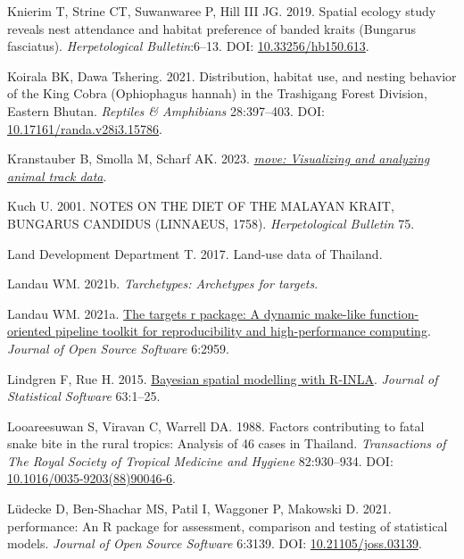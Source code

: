 \documentclass[10pt,a4paper]{article}
\newlength{\cslhangindent}
\newenvironment{CSLReferences}[2] %
 {\begin{list}{}{%
  \setlength{\itemindent}{0pt}
  \setlength{\leftmargin}{0pt}
  \setlength{\parsep}{0pt}
  \ifodd #1
   \setlength{\leftmargin}{\cslhangindent}
   \setlength{\itemindent}{-1\cslhangindent}
  \fi
  \setlength{\itemsep}{#2\baselineskip}}}
 {\end{list}}
\begin{document}
\begin{CSLReferences}{1}{0}
Knierim T, Strine CT, Suwanwaree P, Hill III JG. 2019. Spatial ecology study reveals nest attendance and habitat preference of banded kraits ({Bungarus} fasciatus). \emph{Herpetological Bulletin}:6--13. DOI: \href{https://doi.org/10.33256/hb150.613}{10.33256/hb150.613}.

Koirala BK, Dawa Tshering. 2021. Distribution, habitat use, and nesting behavior of the {King} {Cobra} ({Ophiophagus} hannah) in the {Trashigang} {Forest} {Division}, {Eastern} {Bhutan}. \emph{Reptiles \& Amphibians} 28:397--403. DOI: \href{https://doi.org/10.17161/randa.v28i3.15786}{10.17161/randa.v28i3.15786}.

Kranstauber B, Smolla M, Scharf AK. 2023. \emph{\href{https://CRAN.R-project.org/package=move}{{move}: Visualizing and analyzing animal track data}}.

Kuch U. 2001. {NOTES} {ON} {THE} {DIET} {OF} {THE} {MALAYAN} {KRAIT}, {BUNGARUS} {CANDIDUS} ({LINNAEUS}, 1758). \emph{Herpetological Bulletin} 75.

Land Development Department T. 2017. Land-use data of {Thailand}.

Landau WM. 2021b. \emph{Tarchetypes: Archetypes for targets}.

Landau WM. 2021a. \href{https://doi.org/10.21105/joss.02959}{The targets r package: A dynamic make-like function-oriented pipeline toolkit for reproducibility and high-performance computing}. \emph{Journal of Open Source Software} 6:2959.

Lindgren F, Rue H. 2015. \href{http://www.jstatsoft.org/v63/i19/}{Bayesian spatial modelling with {R}-{INLA}}. \emph{Journal of Statistical Software} 63:1--25.

Looareesuwan S, Viravan C, Warrell DA. 1988. Factors contributing to fatal snake bite in the rural tropics: Analysis of 46 cases in {Thailand}. \emph{Transactions of The Royal Society of Tropical Medicine and Hygiene} 82:930--934. DOI: \href{https://doi.org/10.1016/0035-9203(88)90046-6}{10.1016/0035-9203(88)90046-6}.

Lüdecke D, Ben-Shachar MS, Patil I, Waggoner P, Makowski D. 2021. {performance}: An {R} package for assessment, comparison and testing of statistical models. \emph{Journal of Open Source Software} 6:3139. DOI: \href{https://doi.org/10.21105/joss.03139}{10.21105/joss.03139}.


\end{CSLReferences}
\end{document}

